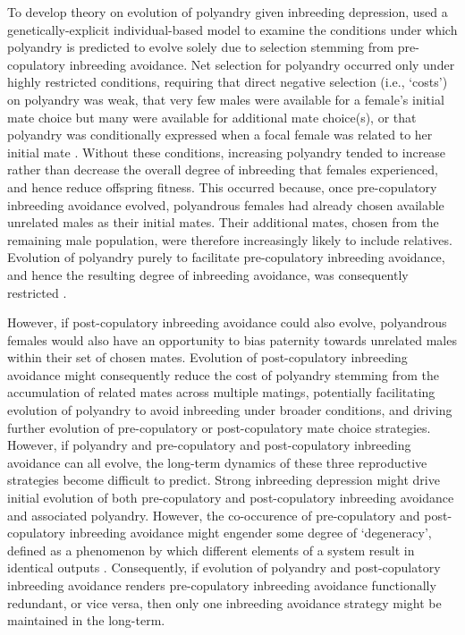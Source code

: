 \documentclass[12pt]{article}
\begin{document}
To develop theory on evolution of polyandry given inbreeding depression, \cite{Duthie} used a genetically-explicit individual-based model to examine the conditions under which polyandry is predicted to evolve solely due to selection stemming from pre-copulatory inbreeding avoidance. Net selection for polyandry occurred only under highly restricted conditions, requiring that direct negative selection (i.e., `costs') on polyandry was weak, that very few males were available for a female's initial mate choice but many were available for additional mate choice(s), or that polyandry was conditionally expressed when a focal female was related to her initial mate \cite[][]{Duthie}. Without these conditions, increasing polyandry tended to increase rather than decrease the overall degree of inbreeding that females experienced, and hence reduce offspring fitness. This occurred because, once pre-copulatory inbreeding avoidance evolved, polyandrous females had already chosen available unrelated males as their initial mates. Their additional mates, chosen from the remaining male population, were therefore increasingly likely to include relatives. Evolution of polyandry purely to facilitate pre-copulatory inbreeding avoidance, and hence the resulting degree of inbreeding avoidance, was consequently restricted \cite[][]{Duthie}.

However, if post-copulatory inbreeding avoidance could also evolve, polyandrous females would also have an opportunity to bias paternity towards unrelated males within their set of chosen mates. Evolution of post-copulatory inbreeding avoidance might consequently reduce the cost of polyandry stemming from the accumulation of related mates across multiple matings, potentially facilitating evolution of polyandry to avoid inbreeding under broader conditions, and driving further evolution of pre-copulatory or post-copulatory mate choice strategies. However, if polyandry and pre-copulatory and post-copulatory inbreeding avoidance can all evolve, the long-term dynamics of these three reproductive strategies become difficult to predict. Strong inbreeding depression might drive initial evolution of both pre-copulatory and post-copulatory inbreeding avoidance and associated polyandry. However, the co-occurence of pre-copulatory and post-copulatory inbreeding avoidance might engender some degree of `degeneracy', defined as a phenomenon by which different elements of a system result in identical outputs \cite[i.e.,][]{Edelman2001}. Consequently, if evolution of polyandry and post-copulatory inbreeding avoidance renders pre-copulatory inbreeding avoidance functionally redundant, or vice versa, then only one inbreeding avoidance strategy might be maintained in the long-term.
\end{document}
